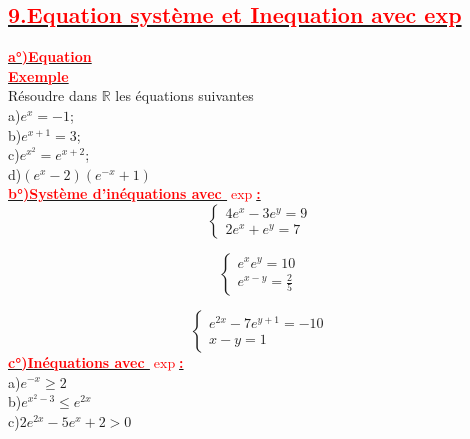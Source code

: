 \documentclass[12pt]{article}
\begin{document}
\subsection*{\underline{\textbf{\textcolor{red}{9.Equation système et Inequation avec exp}}}}
\underline{\textbf{\textcolor{red}{a°)Equation}}}\\
\underline{\textbf{\textcolor{red}{Exemple}}}\\
Résoudre dans $\mathbb{R}$ les équations suivantes\\
a)$e^{x}=-1$;\\  b)$e^{x+1}=3$;\\ c)$e^{x^{2}}=e^{x+2}$;\\ d)$(e^{x}-2)(e^{-x}+1)$\\
\underline{\textbf{\textcolor{red}{b°)Système d'inéquations avec $\exp$:}}}\\
\[
\begin{cases}
4e^{x}-3e^{y} = 9 \\
2e^{x}+e^{y} = 7
\end{cases}
\]

\[
\begin{cases}
e^{x}e^{y} = 10 \\
e^{x-y} = \frac{2}{5}
\end{cases}
\]

\[
\begin{cases}
e^{2x}-7e^{y+1} = -10 \\
x-y = 1
\end{cases}
\]
\underline{\textbf{\textcolor{red}{c°)Inéquations avec $\exp$:}}}\\
a)$e^{-x}\geq2$\\
b)$e^{x^{2}-3}\leq e^{2x}$\\
c)$2e^{2x}-5e^{x}+2>0$
\end{document}
